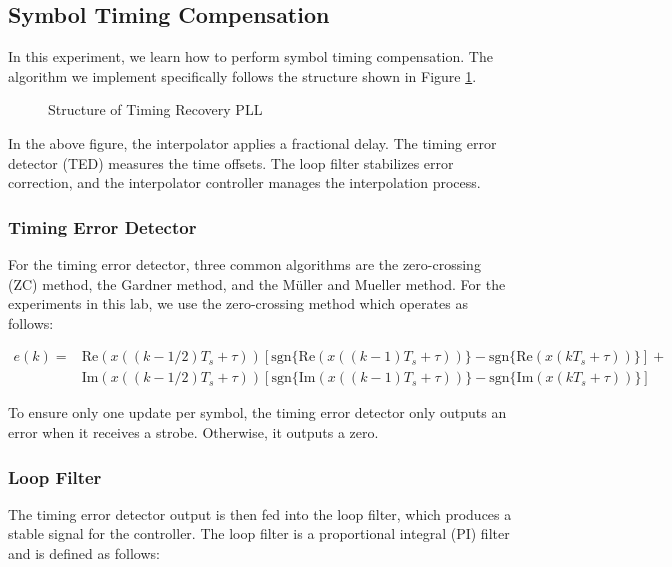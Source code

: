 \documentclass{article}
\begin{document}
\subsection{Symbol Timing Compensation}

In this experiment, we learn how to perform symbol timing compensation. The algorithm we implement specifically follows the structure shown in Figure \ref{fig::timing_recovery_block_diagram}.

\begin{figure}[H]
	\centerline{}
	\caption{Structure of Timing Recovery PLL}
	\label{fig::timing_recovery_block_diagram}
\end{figure}

\noindent In the above figure, the interpolator applies a fractional delay. The timing error detector (TED) measures the time offsets. The loop filter stabilizes error correction, and the interpolator controller manages the interpolation process.

\subsubsection{Timing Error Detector}
For the timing error detector, three common algorithms are the zero-crossing (ZC) method, the Gardner method, and the M\"{u}ller and Mueller method. For the experiments in this lab, we use the zero-crossing method which operates as follows:

\begin{align}
	e(k) = &\text{Re}(x((k-1/2)T_s + \tau))\left[\text{sgn}\{\text{Re}(x((k-1)T_s+\tau))\} - \text{sgn}\{\text{Re}(x(kT_s+\tau))\}\right] + \\
	&\text{Im}(x((k-1/2)T_s + \tau))\left[\text{sgn}\{\text{Im}(x((k-1)T_s+\tau))\} - \text{sgn}\{\text{Im}(x(kT_s+\tau))\}\right]
\end{align}

\noindent To ensure only one update per symbol, the timing error detector only outputs an error when it receives a strobe. Otherwise, it outputs a zero.

\subsubsection{Loop Filter}
The timing error detector output is then fed into the loop filter, which produces a stable signal for the controller. The loop filter is a proportional integral (PI) filter and is defined as follows:
\end{document}
